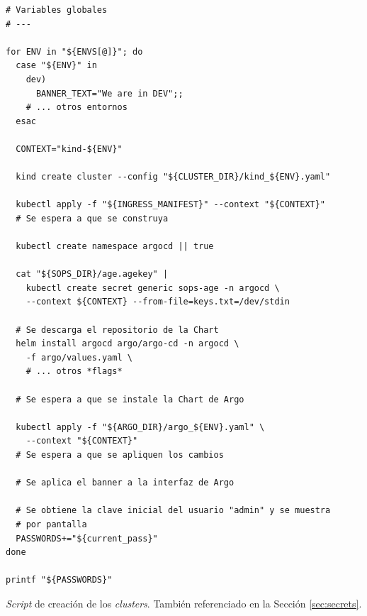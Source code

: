 \begin{longlisting}
  \begin{verbatim}
# Variables globales
# ---

for ENV in "${ENVS[@]}"; do
  case "${ENV}" in
    dev)
      BANNER_TEXT="We are in DEV";;
    # ... otros entornos
  esac

  CONTEXT="kind-${ENV}"

  kind create cluster --config "${CLUSTER_DIR}/kind_${ENV}.yaml"

  kubectl apply -f "${INGRESS_MANIFEST}" --context "${CONTEXT}"
  # Se espera a que se construya

  kubectl create namespace argocd || true

  cat "${SOPS_DIR}/age.agekey" |
    kubectl create secret generic sops-age -n argocd \
    --context ${CONTEXT} --from-file=keys.txt=/dev/stdin

  # Se descarga el repositorio de la Chart
  helm install argocd argo/argo-cd -n argocd \
    -f argo/values.yaml \
    # ... otros *flags*

  # Se espera a que se instale la Chart de Argo

  kubectl apply -f "${ARGO_DIR}/argo_${ENV}.yaml" \
    --context "${CONTEXT}"
  # Se espera a que se apliquen los cambios

  # Se aplica el banner a la interfaz de Argo

  # Se obtiene la clave inicial del usuario "admin" y se muestra
  # por pantalla
  PASSWORDS+="${current_pass}"
done

printf "${PASSWORDS}"
\end{verbatim}
\caption{\textit{Script} de creación de los \textit{clusters}. También referenciado en la Sección \ref{sec:secrets}.}
\label{lst:create-clusters}
\end{longlisting}

